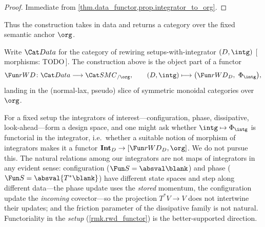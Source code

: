 \begin{proof}
Immediate from \cref{thm.data_functor,prop.integrator_to_org}.
\end{proof}

Thus the construction takes in data and returns a category over the fixed semantic
anchor $\org$.

\begin{remark}\label{rmk.rwd_functor}
Write $\Data$ for the category of rewiring setups-with-integrator $(D,\intg)$
[\,morphisms: TODO\,]. The construction above is the object part of a functor
\[
  \rwd\colon\Data\longrightarrow\SMC_{/\org},
  \qquad (D,\intg)\longmapsto\bigl(\rwd_D,\ \Phi_\intg\bigr),
\]
landing in the (normal-lax, pseudo) slice of symmetric monoidal categories over
$\org$.
\end{remark}


\begin{remark}\label{rmk.integrator_design}
For a fixed setup the integrators of interest---configuration, phase, dissipative,
look-ahead---form a design space, and one might ask whether $\intg\mapsto\Phi_\intg$
is functorial in the integrator, i.e.\ whether a suitable notion of morphism of
integrators makes it a functor $\mathbf{Int}_D\to[\rwd_D,\org]$. We do not pursue
this. The natural relations among our integrators are not maps of integrators in any
evident sense: configuration ($\Fun S=\absval\blank$) and phase
($\Fun S=\absval{T^*\blank}$) have different state spaces and step along different
data---the phase update uses the \emph{stored} momentum, the configuration update the
\emph{incoming} covector---so the projection $T^*V\to V$ does not intertwine their
updates; and the friction parameter of the dissipative family is not natural.
Functoriality in the \emph{setup} (\cref{rmk.rwd_functor}) is the better-supported
direction.
\end{remark}

